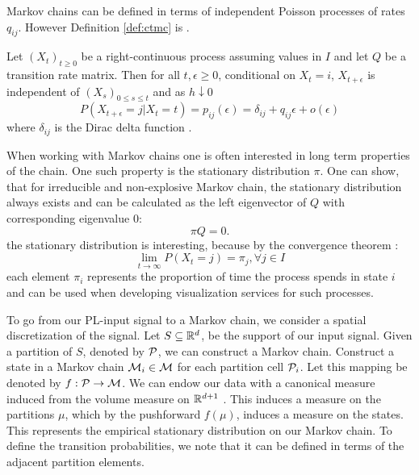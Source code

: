Markov chains can be defined in terms of  independent Poisson processes
of rates $q_{ij}$. However Definition \ref{def:ctmc} is .

\begin{defn}
	\label{def:ctmc}
	Let $(X_t)_{t \ge 0}$ be a right-continuous process assuming values in $I$ and let $Q$
	be a transition rate matrix. Then for all $t, \epsilon \ge 0$, conditional on $X_t = i$,
	$X_{t+\epsilon}$ is independent of $(X_s)_{0 \le s \le t}$ and as $h \downarrow 0$
	\begin{equation}
		\nonumber
		P(X_{t+\epsilon} = j | X_t = t) = p_{ij}(\epsilon) = \delta_{ij} + q_{ij}\epsilon + o(\epsilon)
	\end{equation}
	where $\delta_{ij}$ is the Dirac delta function \cite{norris1998markov}.
\end{defn}
 When working with Markov
chains one is often interested in long term properties of the chain. One such property is the
stationary distribution $\pi$. One can show, that for irreducible and non-explosive Markov chain,
the stationary distribution always exists and can be calculated as the left eigenvector of $Q$ with
corresponding eigenvalue $0$:
\begin{equation}
	\pi Q = 0.
\end{equation}
 the stationary distribution is interesting, because by the convergence theorem
\cite{aldous-fill-2014}:
\begin{equation}
	\lim\limits_{t \rightarrow \infty} P(X_t = j) = \pi_j, \forall j \in I
\end{equation}
each element $\pi_i$ represents the proportion of time the process spends in state $i$ and can be used
when developing visualization services for such processes.

To go from our PL-input signal to a Markov chain, we consider a spatial discretization of the signal.
Let $S\subseteq \mathbb{R}^d$, be the support of our input signal. Given a partition of $S$, denoted by  $\mathcal{P}$, 
we can construct a Markov chain. Construct a  state in a Markov chain $\mathcal{M}_i \in \mathcal{M}$ for each  partition cell $\mathcal{P}_i$. Let this mapping be denoted by $f:\mathcal{P} \rightarrow \mathcal{M}$. We can endow our data with a canonical measure induced from the volume measure on $\mathbb{R}^{d+1}$ . This induces a measure on the partitions $\mu$, which by the  pushforward $f(\mu)$, induces a measure on the states. This represents the empirical stationary distribution on our Markov chain. To define the transition probabilities, we note that it can be defined in terms of the adjacent partition elements.  

